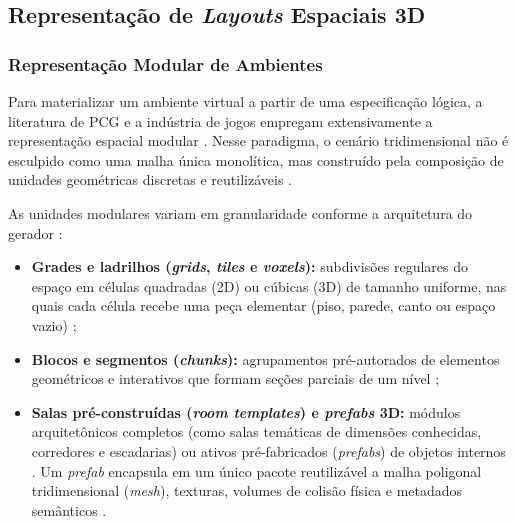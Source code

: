 \subsection{Representação de \textit{Layouts} Espaciais 3D}
\label{sec:layout_3d}

\subsubsection{Representação Modular de Ambientes}
\label{sec:representacao_modular}

Para materializar um ambiente virtual a partir de uma especificação lógica, a literatura de PCG e a indústria de jogos empregam extensivamente a representação espacial modular \cite{linden2014dungeons, shaker2016constructive, xu2025databasedrivenframework3dlevel}. Nesse paradigma, o cenário tridimensional não é esculpido como uma malha única monolítica, mas construído pela composição de unidades geométricas discretas e reutilizáveis \cite{linden2014dungeons, shaker2016constructive, xu2025databasedrivenframework3dlevel}.

As unidades modulares variam em granularidade conforme a arquitetura do gerador \cite{linden2014dungeons, shaker2016constructive, vieira2024metodologia}:
\begin{itemize}
    \item \textbf{Grades e ladrilhos (\textit{grids}, \textit{tiles} e \textit{voxels}):} subdivisões regulares do espaço em células quadradas (2D) ou cúbicas (3D) de tamanho uniforme, nas quais cada célula recebe uma peça elementar (piso, parede, canto ou espaço vazio) \cite{pcgbook, shaker2016constructive, summerville2018procedural};
    \item \textbf{Blocos e segmentos (\textit{chunks}):} agrupamentos pré-autorados de elementos geométricos e interativos que formam seções parciais de um nível \cite{linden2014dungeons, shaker2016constructive};
    \item \textbf{Salas pré-construídas (\textit{room templates}) e \textit{prefabs} 3D:} módulos arquitetônicos completos (como salas temáticas de dimensões conhecidas, corredores e escadarias) ou ativos pré-fabricados (\textit{prefabs}) de objetos internos \cite{linden2014dungeons, xu2025databasedrivenframework3dlevel, regmi2025system}. Um \textit{prefab} encapsula em um único pacote reutilizável a malha poligonal tridimensional (\textit{mesh}), texturas, volumes de colisão física e metadados semânticos \cite{xu2025databasedrivenframework3dlevel, regmi2025system}.
\end{itemize}

